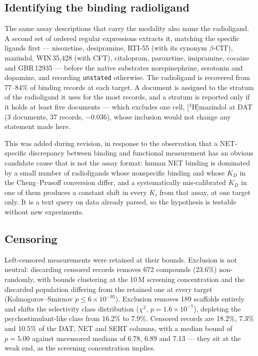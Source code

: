 \documentclass[11pt,a4paper]{article}
\begin{document}
\subsection{Identifying the binding radioligand}
\label{sec:radioligand}
The same assay descriptions that carry the modality also name the radioligand. A second
set of ordered regular expressions extracts it, matching the specific ligands first ---
nisoxetine, desipramine, RTI-55 (with its synonym $\beta$-CIT), mazindol,
WIN\,35,428 (with CFT), citalopram, paroxetine, imipramine, cocaine and GBR\,12935 ---
before the native substrates norepinephrine, serotonin and dopamine, and recording
\texttt{unstated} otherwise. The radioligand is recovered
from 77--84\% of binding records at each target. A document is assigned to the stratum of
the radioligand it uses for the most records, and a stratum is reported only if it holds
at least five documents --- which excludes one cell, [$^{3}$H]mazindol at DAT (3
documents, 37 records, $-0.036$), whose inclusion would not change any statement made
here.

This was added during revision, in response to the observation that a NET-specific
discrepancy between binding and functional measurement has an obvious candidate cause that
is not the assay format: human NET binding is dominated by a small number of radioligands
whose nonspecific binding and whose $K_D$ in the Cheng--Prusoff conversion differ, and a
systematically mis-calibrated $K_D$ in one of them produces a constant shift in every
$K_i$ from that assay, at one target only. It is a text query on data already parsed, so
the hypothesis is testable without new experiments.

\subsection{Censoring}
Left-censored measurements were retained at their bounds. Exclusion is not neutral:
discarding censored records removes 672 compounds (23.6\%) non-randomly, with bounds
clustering at the 10\,\textmu M screening concentration and the discarded
population differing from the retained one at every target (Kolmogorov--Smirnov
$p\leq6\times10^{-95}$). Exclusion removes 189 scaffolds entirely and shifts the
selectivity class distribution ($\chi^2$, $p=1.6\times10^{-7}$), depleting the
psychostimulant-like class from 16.2\% to 7.9\%. Censored records are 18.2\%, 7.3\% and 10.5\%
of the DAT, NET and SERT columns, with a median bound of $p=5.00$ against uncensored
medians of 6.78, 6.89 and 7.13 --- they sit at the weak end, as the screening
concentration implies.
\end{document}
